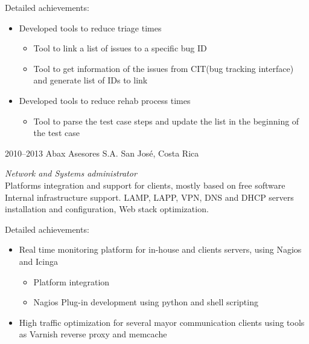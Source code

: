 \documentclass[]{friggeri-cv} %
\begin{document}
\begin{entrylist}
{Detailed achievements:
\begin{itemize}
\item Developed tools to reduce triage times
\begin{itemize}
\item Tool to link a list of issues to a specific bug ID
\item Tool to get information of the issues from CIT(bug tracking interface) and generate list of IDs to link
\end{itemize}
\item Developed tools to reduce rehab process times
\begin{itemize}
\item Tool to parse the test case steps and update the list in the beginning of the test case 
\end{itemize}
\end{itemize}
}


\entry
{2010--2013}
{Abax Asesores S.A.}
{San José, Costa Rica}
{\emph{Network and Systems administrator}\\
Platforms integration and support for clients, mostly based on free software Internal infrastructure support.
LAMP, LAPP, VPN, DNS and DHCP servers installation and configuration, Web stack optimization.

Detailed achievements:
\begin{itemize}
\item Real time monitoring platform for in-house and clients servers, using Nagios and Icinga
\begin{itemize}
\item Platform integration
\item Nagios Plug-in development using python and shell scripting
\end{itemize}
\item High traffic optimization for several mayor communication clients using tools as Varnish reverse proxy and memcache
\end{itemize}
}
\end{entrylist}
\end{document}

